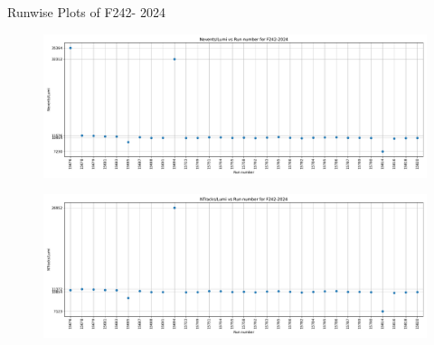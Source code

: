 \begin{frame}{Runwise Plots of F242- 2024}
    \begin{figure}
        \centering
        \includegraphics[width=1.0\textwidth]{plots_runwise/NEventsbyLumi_2024_F242.pdf}
    \end{figure}
    \vspace{-0.35cm}
    \begin{figure}
        \centering
        \includegraphics[width=1.0\textwidth]{plots_runwise/NTracksbyLumi_2024_F242.pdf}
    \end{figure}
\end{frame}

